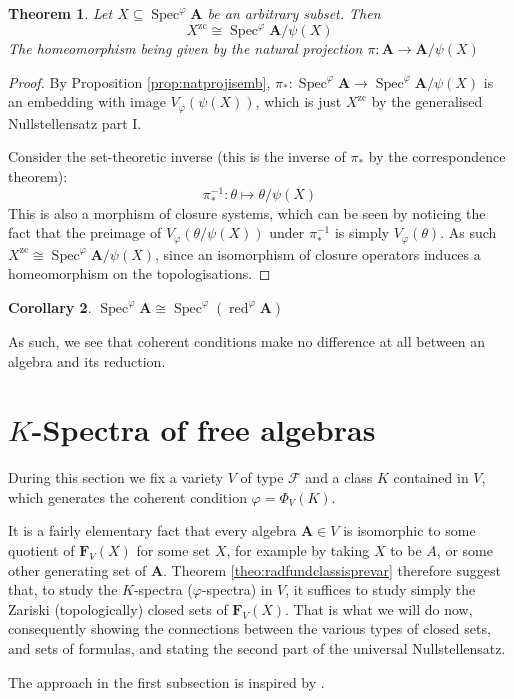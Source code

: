 \documentclass{article}
\theoremstyle{plain}
\newtheorem{theorem}{Theorem}[section]
\newtheorem{corollary}[theorem]{Corollary}
\theoremstyle{definition}
\newcommand{\Spec}{\operatorname{Spec}}
\begin{document}
\begin{theorem} \label{theo:closedsetisspec}
    Let $X \subseteq \Spec^\varphi\mathbf{A}$ be an arbitrary subset.
    Then
    $$X^\text{zc} \cong \Spec^\varphi \mathbf{A}/\psi(X)$$
    The homeomorphism being given by the natural projection $\pi \colon \mathbf{A} \rightarrow \mathbf{A}/\psi(X)$
\end{theorem}
\begin{proof}
    By Proposition \ref{prop:natprojisemb}, $\pi_\ast \colon \Spec^\varphi\mathbf{A} \rightarrow \Spec^\varphi\mathbf{A}/\psi(X)$ is an embedding with image $V_\varphi(\psi(X))$, which is just $X^\text{zc}$ by the generalised Nullstellensatz part I.\par
    Consider the set-theoretic inverse (this is the inverse of $\pi_\ast$ by the correspondence theorem):
    $$\pi_\ast^{-1} \colon \theta \mapsto \theta/\psi(X)$$
    This is also a morphism of closure systems, which can be seen by noticing the fact that the preimage of $V_\varphi(\theta/\psi(X))$ under $\pi_\ast^{-1}$ is simply $V_\varphi(\theta)$.
    As such $X^\text{zc} \cong \Spec^\varphi\mathbf{A}/\psi(X)$, since an isomorphism of closure operators induces a homeomorphism on the topologisations.
\end{proof}

\begin{corollary}
    $\Spec^\varphi\mathbf{A} \cong\Spec^\varphi(\operatorname{red}^\varphi\mathbf{A})$
\end{corollary}

As such, we see that coherent conditions make no difference at all between an algebra and its reduction.



\section{$K$-Spectra of free algebras}

During this section we fix a variety $V$ of type $\mathscr{F}$ and a class $K$ contained in $V$, which generates the coherent condition $\varphi = \Phi_V(K)$.\par
It is a fairly elementary fact that every algebra $\mathbf{A}\in V$ is isomorphic to some quotient of $\mathbf{F}_V(X)$ for some set $X$, for example by taking $X$ to be $A$, or some other generating set of $\mathbf{A}$.
Theorem \ref{theo:radfundclassisprevar} therefore suggest that, to study the $K$-spectra ($\varphi$-spectra) in $V$, it suffices to study simply the Zariski (topologically) closed sets of $\mathbf{F}_V(X)$.
That is what we will do now, consequently showing the connections between the various types of closed sets, and sets of formulas, and stating the second part of the universal Nullstellensatz.\par
The approach in the first subsection is inspired by \cite{Equationaldomains}.
\end{document}
